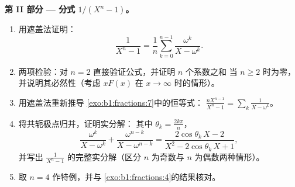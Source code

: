 \begin{problem}
\medskip
\noindent\textbf{第 II 部分 --- 分式 $1/(X^n - 1)$。}
\begin{enumerate}[resume]
  \item 用遮盖法证明：
        \[
        \frac{1}{X^n - 1}
        = \frac1n\sum_{k=0}^{n-1}\frac{\omega^k}{X - \omega^k} .
        \]
  \item 两项检验：对 $n =
        2$ 直接验证公式，并证明 $n$ 个系数之和
        当 $n \geq 2$ 时为零，并说明其必然性（考虑
        $xF(x)$ 在 $x \to \infty$ 时的情形）。
  \item 用遮盖法重新推导
        \cref{exo:b1:fractions:7}中的恒等式：
        $\frac{nX^{n-1}}{X^n-1} = \sum_k \frac1{X - \omega^k}$。
  \item 将共轭极点归并，证明实分解：
        其中 $\theta_k = \frac{2k\pi}n$，
        \[
        \frac{\omega^k}{X - \omega^k} +
        \frac{\omega^{n-k}}{X - \omega^{n-k}}
        = \frac{2\cos\theta_k\,X - 2}
        {X^2 - 2\cos\theta_k\,X + 1} ,
        \]
        并写出
        $\frac1{X^n-1}$ 的完整实分解（区分 $n$ 为奇数与 $n$ 为偶数两种情形）。
  \item 取 $n = 4$ 作特例，并与
        \cref{exo:b1:fractions:4}的结果核对。
\end{enumerate}


\end{problem}
